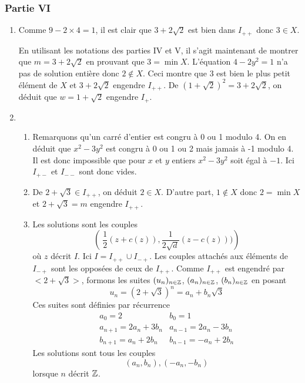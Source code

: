 \subsubsection*{Partie VI}
\begin{enumerate}
\item Comme $9-2\times 4=1$, il est clair que $3+2\sqrt 2$ est bien dans $I_{++}$ donc $3\in X$.

En utilisant les notations des parties IV et V, il s'agit maintenant de montrer que $m=3+2\sqrt 2$ en prouvant que $3=\min X$.
L'équation $4-2y^2=1$ n'a pas de solution entière donc $2\not \in X$. Ceci montre que 3 est bien le plus petit élément de $X$ et $3+2\sqrt{2}$ engendre $I_{++}$.\newline
De $(1+\sqrt 2)^2=3+2\sqrt 2$, on déduit que $w=1+\sqrt 2$ engendre $I_{+}$.
\item \begin{enumerate} \item Remarquons qu'un carré d'entier est congru à 0 ou 1 modulo 4. On en déduit que $x^2-3y^2$ est congru à 0 ou 1 ou 2 mais jamais à -1 modulo 4. Il est donc impossible que pour $x$ et $y$ entiers $x^2-3y^2$ soit égal à $-1$.\newline
Ici $I_{+-}$ et $I_{--}$ sont donc vides.
\item De $2+\sqrt 3 \in I_{++}$, on déduit $2\in X$. D'autre part, $1\not \in X$ donc $2=\min X$ et $2+\sqrt 3=m$ engendre $I_{++}$.
\item Les solutions sont les couples
$$\left(\ \frac{1}{2}(z+c(z)),\frac{1}{2\sqrt d}(z-c(z)))\right)$$
où $z$ décrit $I$. Ici $I=I_{++}\cup I_{-+}$. Les couples attachés aux éléments de $ I_{-+}$ sont les opposées de ceux de $ I_{++}$.\newline
Comme $I_{++}$ est engendré par $<2+\sqrt3>$, formons les suites $(u_n)_{n\in \mathbb{Z}}$, $(a_n)_{n\in \mathbb{Z}}$, $(b_n)_{n\in \mathbb{Z}}$ en posant
$$u_{n}=(2+\sqrt3)^n=a_{n}+b_{n}\sqrt 3$$
Ces suites sont définies par récurrence
$$\begin{array}{cc}
a_0=2&b_0=1\\
a_{n+1}=2a_n+3b_n & a_{n-1}=2a_n-3b_n\\
b_{n+1}=a_n+2b_n & b_{n-1}=-a_n+2b_n
\end{array}$$
Les solutions sont tous les couples $$(a_n,b_n),(-a_n,-b_n)$$ lorsque $n$ décrit $\mathbb{Z}$.
\end{enumerate}
\end{enumerate}

